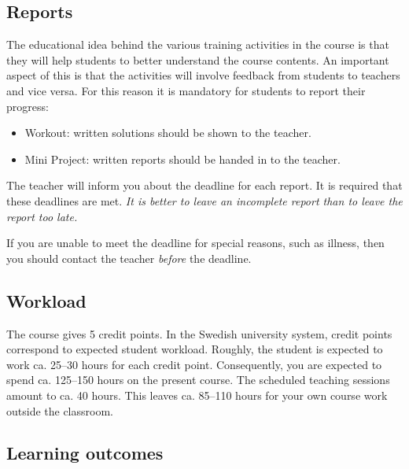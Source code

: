 \documentclass[a4paper,12pt]{article}
\begin{document}
\subsection*{Reports}
\setlength{\leftskip}{1em} 
The educational idea behind the various training activities in the course is that
they will help students to better understand the course contents. An important
aspect of this is that the activities will involve feedback from students to
teachers and vice versa. For this reason it is mandatory for students to report
their progress:
\begin{itemize}
	\item Workout: written solutions should be shown to the teacher.
	\item Mini Project: written reports should be handed in to the teacher.
\end{itemize}


The teacher will inform you about the deadline for each report. It is required
that these deadlines are met. \emph{It is better to leave an incomplete report than to
leave the report too late.}

If you are unable to meet the deadline for special reasons, such as illness, then
you should contact the teacher \emph{before} the deadline.





\setlength{\leftskip}{0em}
\subsection*{Workload}
\setlength{\leftskip}{1em}

The course gives 5 credit points. In the Swedish university system, credit points
correspond to expected student workload. Roughly, the student is expected to
work ca. 25--30 hours for each credit point. Consequently, you are expected to
spend ca. 125--150 hours on the present course. The scheduled teaching sessions
amount to ca. 40 hours. This leaves ca. 85--110 hours for your own course work
outside the classroom.

\setlength{\leftskip}{0em}
\subsection*{Learning outcomes}
\setlength{\leftskip}{1em}
\end{document}
